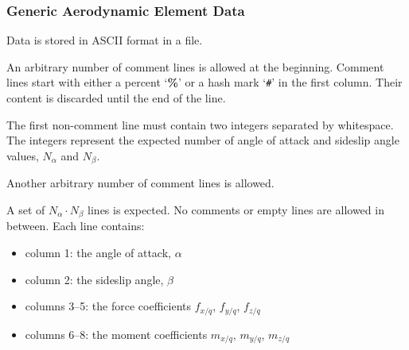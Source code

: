 \subsubsection{Generic Aerodynamic Element Data}
Data is stored in ASCII format in a file.

An arbitrary number of comment lines is allowed at the beginning.
Comment lines start with either a percent `\textbf{\%}'
or a hash mark `\texttt{\#}' in the first column.
Their content is discarded until the end of the line.

The first non-comment line must contain two integers separated by whitespace.
The integers represent the expected number of angle of attack
and sideslip angle values, $N_\alpha$ and $N_\beta$.

Another arbitrary number of comment lines is allowed.

A set of $N_\alpha \cdot N_\beta$ lines is expected.
No comments or empty lines are allowed in between.
Each line contains:
\begin{itemize}
\item column 1: the angle of attack, $\alpha$
\item column 2: the sideslip angle, $\beta$
\item columns 3--5: the force coefficients $f_{x/q}$, $f_{y/q}$, $f_{z/q}$
\item columns 6--8: the moment coefficients $m_{x/q}$, $m_{y/q}$, $m_{z/q}$
\end{itemize}


